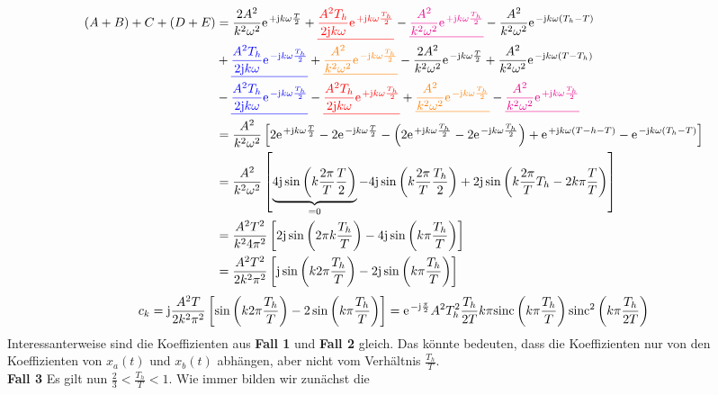 \documentclass[11pt,a4paper,DIV=12]{scrartcl}
\newcommand{\sinc}{\mathrm{sinc}}
\begin{document}
\begin{align}
	(A+B)+C+(D+E)&=\frac{2A^2}{k^2\omega^2}\e^{+\im k \omega \frac{T}{2}}+\ured{\frac{A^2T_h}{2\im k \omega}\e^{+\im k \omega \frac{T_h}{2}}}-\umagenta{\frac{A^2}{k^2\omega^2}\e^{+\im k \omega\frac{T_h}{2}}}-\frac{A^2}{k^2\omega^2}\e^{-\im k \omega (T_h-T)}\nonumber \\
	&+\ublue{\frac{A^2T_h}{2\im k \omega}\e^{-\im k \omega \frac{T_h}{2}}}+\uorange{\frac{A^2}{ k^2 \omega^2}\e^{-\im k \omega \frac{T_h}{2}}}-\frac{2A^2}{k^2\omega^2}\e^{-\im k \omega \frac{T}{2}}+\frac{A^2}{k^2\omega^2}\e^{-\im k \omega (T-T_h)}\nonumber \\
	&-\ublue{\frac{A^2T_h}{2\im k \omega}\e^{-\im k \omega \frac{T_h}{2}}}-\ured{\frac{A^2T_h}{2\im k \omega}\e^{+\im k \omega \frac{T_h}{2}}}+\uorange{\frac{A^2}{k^2\omega^2}\e^{-\im k \omega \frac{T_h}{2}}}-\umagenta{\frac{A^2}{k^2\omega^2}\e^{+\im k \omega \frac{T_h}{2}}}\nonumber \\
	&=\frac{A^2}{k^2\omega^2}\left [2\e^{+\im k \omega\frac{T}{2}}-2\e^{-\im k \omega \frac{T}{2}}-\left (2\e^{+\im k \omega \frac{T_h}{2}}-2\e^{-\im k \omega \frac{T_h}{2}}\right )+\e^{+\im k \omega(T-h-T)}-\e^{-\im k \omega(T_h-T)}\right ]\nonumber \\
	&=\frac{A^2}{k^2\omega^2}\left [\underbrace{4\im\sin\left(k\frac {2\pi}{T}\frac{T}{2}\right)}_{=0}-4\im\sin\left(k \frac{2\pi}{T}\frac{T_h}{2}\right)+2\im\sin\left(k\frac{2\pi}{T}T_h-2k\pi\frac{T}{T}\right) \right ]\nonumber \\
	&=\frac{A^2T^2}{k^24\pi^2}\left [2\im\sin\left(2\pi k \frac{T_h}{T}\right)-4\im\sin\left(k\pi\frac{T_h}{T}\right)\right ]\nonumber \\
	&=\frac{A^2T^2}{2k^2\pi^2}\left [\im\sin\left(k2\pi\frac{T_h}{T}\right)-2\im\sin\left(k\pi\frac{T_h}{T}\right)\right ]
\end{align}
%
%
%
\begin{align}
	c_k=\im\frac{A^2T}{2k^2\pi^2}\left [\sin\left(k2\pi\frac{T_h}{T}\right)-2\sin\left(k\pi\frac{T_h}{T}\right)\right]=\e^{-\im\frac{\pi}{2}}A^2T_h^2\frac{T_h}{2T}k\pi\sinc\left(k\pi\frac{T_h}{T}\right)\sinc^2\left(k\pi\frac{T_h}{2T}\right)
\end{align}
%
%
Interessanterweise sind die Koeffizienten aus \textbf{Fall 1} und
\textbf{Fall 2} gleich.
%
Das könnte bedeuten, dass die Koeffizienten nur von den Koeffizienten von
$x_{a}(t)$ und $x_{b}(t)$ abhängen, aber nicht vom Verhältnis $\frac{T_h}{T}$.
%
\\
\textbf{Fall 3}
Es gilt nun $\frac{2}{3} < \frac{T_h}{T} < 1$. Wie immer bilden wir zunächst die
\end{document}
